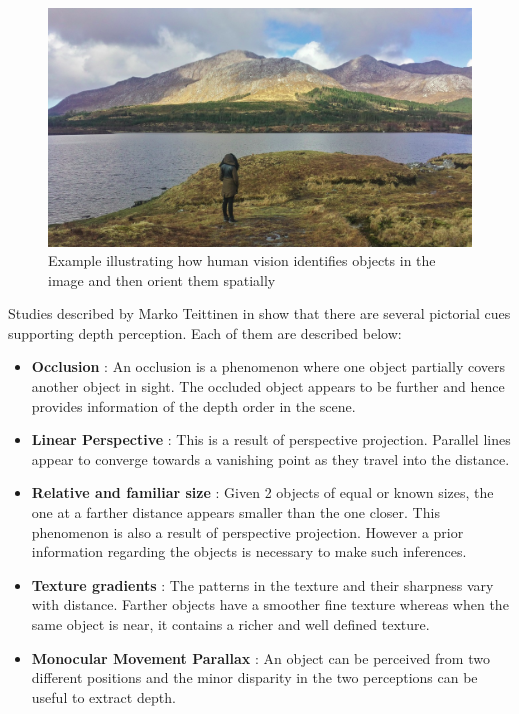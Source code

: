 \begin{figure}[h]
	\centering
	\includegraphics[width=\textwidth]{content/imgs/ireland-g77640d1c9_1280}
	\caption{Example illustrating how human vision identifies objects in the image and then orient them spatially}
	\label{fig:ireland-g77640d1c91280}
\end{figure}

Studies described by Marko Teittinen in \cite{teittinen1993depth} show that there are several pictorial cues supporting depth perception. Each of them are described below:
\begin{itemize}
	\item \textbf{Occlusion} : An occlusion is a phenomenon where one object partially covers another object in sight. The occluded object appears to be further and hence provides information of the depth order in the scene. 
	
	\item \textbf{Linear Perspective} : This is a result of perspective projection. Parallel lines appear to converge towards a vanishing point as they travel into the distance.
	
	\item \textbf{Relative and familiar size} : Given 2 objects of equal or known sizes, the one at a farther distance appears smaller than the one closer. This phenomenon is also a result of perspective projection. However a prior information regarding the objects is necessary to make such inferences.
	
	\item \textbf{Texture gradients} : The patterns in the texture and their sharpness vary with distance. Farther objects have a smoother fine texture whereas when the same object is near, it contains a richer and well defined texture.
	\item \textbf{Monocular Movement Parallax} : An object can be perceived from two different positions and the minor disparity in the two perceptions can be useful to extract depth. 
\end{itemize}

